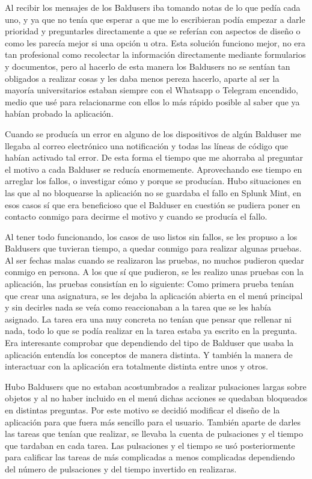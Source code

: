 Al recibir los mensajes de los Baldusers iba tomando notas de lo que pedía cada uno, y ya que no tenía que esperar a que me lo escribieran podía empezar a darle prioridad y preguntarles directamente a que se referían con aspectos de diseño o como les parecía mejor si una opción u otra.
Esta solución funciono mejor, no era tan profesional como recolectar la información directamente mediante formularios y documentos, pero al hacerlo de esta manera los Baldusers no  se sentían tan obligados a realizar cosas y les daba menos pereza hacerlo, aparte al ser la mayoría universitarios estaban siempre con el Whatsapp o Telegram encendido, medio que usé para relacionarme con ellos lo más rápido posible al saber que ya habían probado la aplicación.

Cuando se producía un error en alguno de los dispositivos de algún Balduser me llegaba al correo electrónico una notificación y todas las líneas de código que habían activado tal error.
De esta forma el tiempo que me ahorraba al preguntar el motivo a cada Balduser se reducía enormemente.
Aprovechando ese tiempo en arreglar los fallos, o investigar cómo y porque se producían.
Hubo situaciones en las que al no bloquearse la aplicación no se guardaba el fallo en Splunk Mint, en esos casos sí que era beneficioso que el Balduser en cuestión se pudiera poner en contacto conmigo para decirme el motivo y cuando se producía el fallo.

Al tener todo funcionando, los casos de uso listos sin fallos, se les propuso a los Baldusers que tuvieran tiempo, a quedar conmigo para realizar algunas pruebas.
Al ser fechas malas cuando se realizaron las pruebas, no muchos pudieron quedar conmigo en persona. A los que sí que pudieron, se les realizo unas pruebas con la aplicación, las pruebas consistían en lo siguiente:
Como primera prueba tenían que crear una asignatura, se les dejaba la aplicación abierta en el menú principal y sin decirles nada se veía como reaccionaban a la tarea que se les había asignado. La tarea era una muy concreta no tenían que pensar que rellenar ni nada, todo lo que se podía realizar en la tarea estaba ya escrito en la pregunta.
Era interesante comprobar que dependiendo del tipo de Balduser que usaba la aplicación entendía los conceptos de manera distinta. Y también la manera de interactuar con la aplicación era totalmente distinta entre unos y otros.

Hubo Baldusers que no estaban acostumbrados a realizar pulsaciones largas sobre objetos y al no haber incluido en el menú dichas acciones se quedaban bloqueados en distintas preguntas.
Por este motivo se decidió modificar el diseño de la aplicación para que fuera más sencillo para el usuario.
También aparte de darles las tareas que tenían que realizar, se llevaba la cuenta de pulsaciones y el tiempo que tardaban en cada tarea.
Las pulsaciones y el tiempo se usó posteriormente para calificar las tareas de más complicadas a menos complicadas dependiendo del número de pulsaciones y del tiempo invertido en realizaras.

